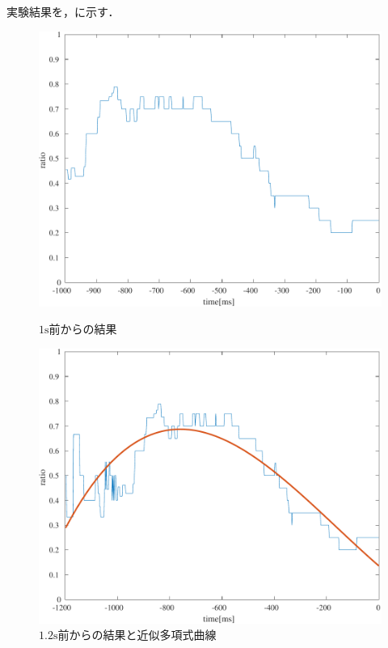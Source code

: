 \section{\result}
実験結果を，に示す．
\begin{figure}[H]
    \centering
    \begin{minipage}{.48\textwidth}
        \centering
        \includegraphics[keepaspectratio,width=.8\textwidth]{../../Figures/12_01_graph.pdf}
        \caption{\(1\textrm{s}\)前からの結果}
        \label{fig:\kadaia 実験結果}
    \end{minipage}
    \begin{minipage}{.48\textwidth}
        \centering
        \includegraphics[keepaspectratio,width=.8\textwidth]{../../Figures/12_02_graph.pdf}
        \caption{\(1.2\textrm{s}\)前からの結果と近似多項式曲線}
        \label{fig:\kadaia 実験結果2}
    \end{minipage}
\end{figure}
